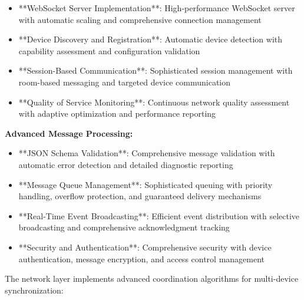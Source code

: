 \documentclass[12pt,a4paper]{article}
\begin{document}
\begin{itemize}
\item **WebSocket Server Implementation**: High-performance WebSocket server with automatic scaling and comprehensive
  connection management
\item **Device Discovery and Registration**: Automatic device detection with capability assessment and configuration
  validation
\item **Session-Based Communication**: Sophisticated session management with room-based messaging and targeted device
  communication
\item **Quality of Service Monitoring**: Continuous network quality assessment with adaptive optimization and performance
  reporting

\end{itemize}
\textbf{Advanced Message Processing:}

\begin{itemize}
\item **JSON Schema Validation**: Comprehensive message validation with automatic error detection and detailed diagnostic
  reporting
\item **Message Queue Management**: Sophisticated queuing with priority handling, overflow protection, and guaranteed
  delivery mechanisms
\item **Real-Time Event Broadcasting**: Efficient event distribution with selective broadcasting and comprehensive
  acknowledgment tracking
\item **Security and Authentication**: Comprehensive security with device authentication, message encryption, and access
  control management

\end{itemize}
The network layer implements advanced coordination algorithms for multi-device synchronization:
\end{document}
